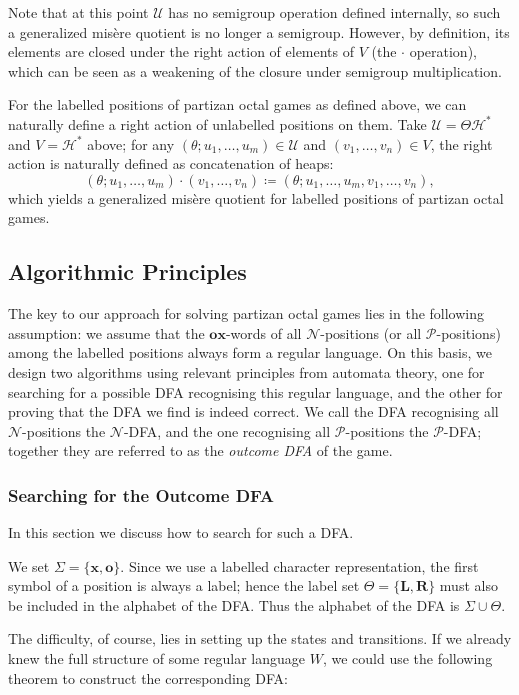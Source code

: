 \documentclass[11pt]{article}
\theoremstyle{definition}
\theoremstyle{plain}
\newcommand{\varP}{\mathcal{P}}
\newcommand{\varN}{\mathcal{N}}
\newcommand{\rmL}{\mathbf{L}}
\newcommand{\rmR}{\mathbf{R}}
\newcommand{\x}{\mathbf{x}}
\newcommand{\e}{\mathbf{o}}
\newcommand{\varH}{\mathcal{H}}
\newcommand{\varU}{\mathcal{U}}
\begin{document}
Note that at this point $\varU$ has no semigroup operation defined internally, so such a generalized misère quotient is no longer a semigroup.
However, by definition, its elements are closed under the right action of elements of $V$ (the $\cdot$ operation), which can be seen as a weakening of the closure under semigroup multiplication.

For the labelled positions of partizan octal games as defined above, we can naturally define a right action of unlabelled positions on them.
Take $\varU=\varTheta\varH^*$ and $V=\varH^*$ above; for any $(\theta; u_1, \ldots, u_m)\in \varU$ and $(v_1, \ldots, v_n) \in V$,
the right action is naturally defined as concatenation of heaps:
\[
    (\theta; u_1, \ldots, u_m) \cdot (v_1, \ldots, v_n) \coloneq (\theta; u_1, \ldots, u_m, v_1, \ldots, v_n),
\]
which yields a generalized misère quotient for labelled positions of partizan octal games.

\subsection{Algorithmic Principles}

The key to our approach for solving partizan octal games lies in the following assumption:
we assume that the $\e\x$-words of all $\varN$-positions (or all $\varP$-positions) among the labelled positions always form a regular language.
On this basis, we design two algorithms using relevant principles from automata theory,
one for searching for a possible DFA recognising this regular language, and the other for proving that the DFA we find is indeed correct.
We call the DFA recognising all $\varN$-positions the $\varN$-DFA, and the one recognising all $\varP$-positions the $\varP$-DFA; together they are referred to as the \textit{outcome DFA} of the game.

\subsubsection{Searching for the Outcome DFA}

In this section we discuss how to search for such a DFA.

We set $\varSigma =\{\x, \e\}$.
Since we use a labelled character representation, the first symbol of a position is always a label; hence the label set $\varTheta=\{\rmL, \rmR\}$ must also be included in the alphabet of the DFA. Thus the alphabet of the DFA is $\varSigma \cup \varTheta$.

The difficulty, of course, lies in setting up the states and transitions. If we already knew the full structure of some regular language $W$, we could use the following theorem to construct the corresponding DFA:
\end{document}
